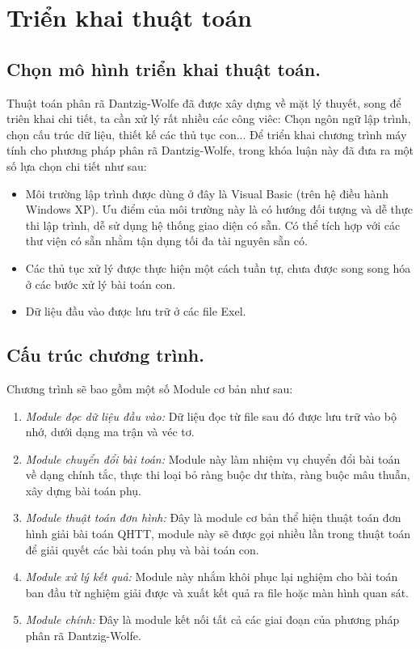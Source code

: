 \section{Triển khai thuật toán}
\subsection{Chọn mô hình triển khai thuật toán. }
Thuật toán phân rã Dantzig-Wolfe đã được xây dựng về mặt lý thuyết, song để triên khai chi tiết, ta cần xử lý rất nhiều các công viêc: Chọn ngôn ngữ lập trình, chọn cấu trúc dữ liệu, thiết kế các thủ tục con...
Để triển khai chương trình máy tính cho phương pháp phân rã Dantzig-Wolfe, trong khóa luận này đã đưa ra một số lựa chọn chi tiết như sau:
\begin{itemize}
\item Môi trường lập trình được dùng ở đây là Visual Basic (trên hệ điều hành Windows XP). Ưu điểm của môi trường này là có hướng đối tượng và dễ thực thi lập trình, dễ sử dụng hệ thống giao diện có sẵn. Có thể tích hợp với các thư viện có sẵn nhằm tận dụng tối đa tài nguyên sẵn có. 
\item Các thủ tục xử lý được thực hiện một cách tuần tự, chưa được song song hóa ở các bước xử lý bài toán con.
\item Dữ liệu đầu vào được lưu trữ ở các file Exel.
\end{itemize}

\subsection{Cấu trúc chương trình. }
Chương trình sẽ bao gồm một số Module cơ bản như sau:
\begin{enumerate}
\item {\it Module đọc dữ liệu đầu vào: } Dữ liệu đọc từ file sau đó được lưu trữ vào bộ nhớ, dưới dạng ma trận và véc tơ.
\item {\it Module chuyển đổi bài toán: } Module này làm nhiệm vụ chuyển đổi bài toán về dạng chính tắc, thực thi loại bỏ ràng buộc dư thừa, ràng buộc mâu thuẫn, xây dựng bài toán phụ.
\item {\it Module thuật toán đơn hình: } Đây là module cơ bản thể hiện thuật toán đơn hình giải bài toán QHTT, module này sẽ được gọi nhiều lần trong thuật toán để giải quyết các bài toán phụ và bài toán con.
\item{\it Module xử lý kết quả: } Module này nhắm khôi phục lại nghiệm cho bài toán ban đầu từ nghiệm giải được và xuất kết quả ra file hoặc màn hình quan sát.
\item{\it Module chính: } Đây là module kết nối tất cả các giai đoạn của phương pháp phân rã Dantzig-Wolfe. 
\end{enumerate}

